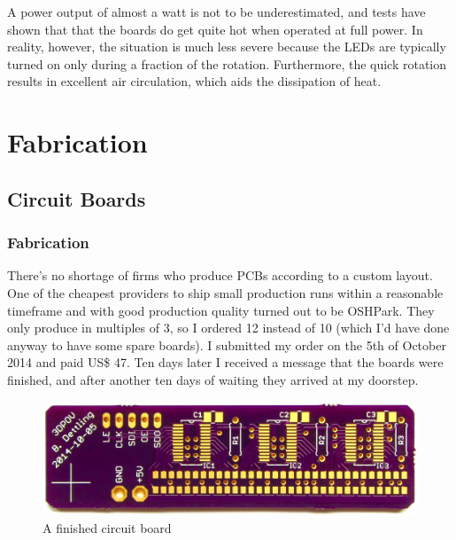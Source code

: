 \documentclass[a4paper, 11pt, titlepage]{report}
\begin{document}
A power output of almost a watt is not to be underestimated, and tests have shown that that the
boards do get quite hot when operated at full power. In reality, however, the situation is much
less severe because the LEDs are typically turned on only during a fraction of the rotation.
Furthermore, the quick rotation results in excellent air circulation, which aids the dissipation
of heat.









\chapter{Fabrication}

\section{Circuit Boards}

\subsection{Fabrication}

There's no shortage of firms who produce PCBs according to a custom layout. One of the cheapest 
providers to ship small production runs within a reasonable timeframe and with good production
quality turned out to be OSHPark. They only produce in multiples of 3, so I ordered 12 instead of
10 (which I'd have done anyway to have some spare boards). I submitted my order on the 5th of 
October 2014 and paid US\$ 47. Ten days later I received a message that the boards were finished,
and after another ten days of waiting they arrived at my doorstep.


\begin{figure}[h]
\vspace{3mm}
\includegraphics[width=\textwidth]{./images/board-finished.jpeg}
\vspace{-8mm}
\caption{A finished circuit board} 
\end{figure}
\end{document}
